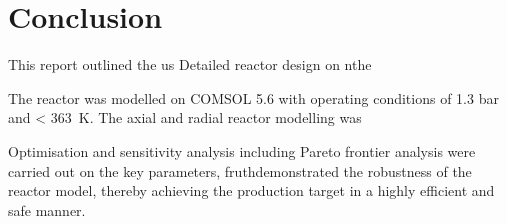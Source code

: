 \section{Conclusion} \label{sec:conclusion}
This report outlined the us
Detailed reactor design on nthe 

The reactor was modelled on COMSOL 5.6 with operating conditions of 1.3 bar and \SI{< 363}{\K}.
The axial and radial reactor modelling was 

Optimisation and sensitivity analysis including Pareto frontier analysis were carried out on the key parameters, fruthdemonstrated the robustness of the reactor model, thereby achieving the production target in a highly efficient and safe manner. 